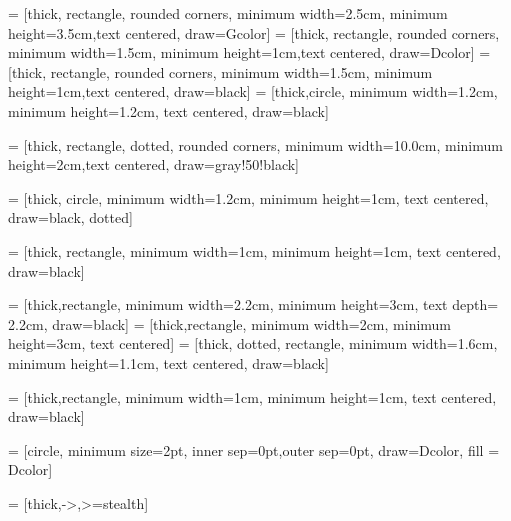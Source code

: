 



 = [thick, rectangle, rounded corners, minimum width=2.5cm, minimum height=3.5cm,text centered, draw=Gcolor]
 = [thick, rectangle, rounded corners, minimum width=1.5cm, minimum height=1cm,text centered, draw=Dcolor]
 = [thick, rectangle, rounded corners, minimum width=1.5cm, minimum height=1cm,text centered, draw=black]
 = [thick,circle, minimum width=1.2cm, minimum height=1.2cm, text centered, draw=black]

 = [thick, rectangle, dotted, rounded corners, minimum width=10.0cm, minimum height=2cm,text centered, draw=gray!50!black]

 = [thick, circle, minimum width=1.2cm, minimum height=1cm, text centered, draw=black, dotted]

 = [thick, rectangle, minimum width=1cm, minimum height=1cm, text centered, draw=black]

 = [thick,rectangle, minimum width=2.2cm, minimum height=3cm, text depth= 2.2cm, draw=black]
 = [thick,rectangle, minimum width=2cm, minimum height=3cm, text centered]
 = [thick, dotted, rectangle, minimum width=1.6cm, minimum height=1.1cm, text centered, draw=black]


 = [thick,rectangle, minimum width=1cm, minimum height=1cm, text centered, draw=black]


 = [circle, minimum size=2pt, inner sep=0pt,outer sep=0pt, draw=Dcolor, fill = Dcolor]

 = [thick,->,>=stealth]

